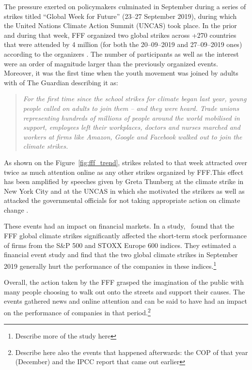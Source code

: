 \documentclass[12pt]{article}
\begin{document}
The pressure exerted on policymakers culminated in September during a series of strikes titled ``Global Week for Future'' (23--27 September 2019), during which the United Nations Climate Action Summit (UNCAS) took place. In the prior and during that week, FFF organized two global strikes across +270 countries that were attended by 4 million (for both the 20--09--2019 and 27--09--2019 ones) according to the organizers \parencite{fffStrikeStats}. The number of participants as well as the interest were an order of magnitude larger than the previously organized events. Moreover, it was the first time when the youth movement was joined by adults with \citeauthor{watts2019climate} of The Guardian describing it as:

\begin{quote}
    \small
    \textit{For the first time since the school strikes for climate began last year, young people called on adults to join them – and they were heard. Trade unions representing hundreds of millions of people around the world mobilised in support, employees left their workplaces, doctors and nurses marched and workers at firms like Amazon, Google and Facebook walked out to join the climate strikes.} \parencite{watts2019climate}
\end{quote}

As shown on the Figure~\ref{fig:fff_trend}, strikes related to that week attracted over twice as much attention online as any other strikes organized by FFF.\@ This effect has been amplified by speeches given by Greta Thunberg at the climate strike in New York City and at the UNCAS in which she motivated the strikers as well as attacked the governmental officials for not taking appropriate action on climate change \parencite{2019thunberg}.

These events had an impact on financial markets. In a \citeyear{schusterStockPriceReactions2023} study,~\citeauthor{schusterStockPriceReactions2023} found that the FFF global climate strikes significantly affected the short-term stock performance of firms from the S\&P 500 and STOXX Europe 600 indices. They estimated a financial event study and find that the two global climate strikes in September 2019 generally hurt the performance of the companies in these indices.\footnote{Describe more of the study here}

Overall, the action taken by the FFF grasped the imagination of the public with many people choosing to walk out onto the streets and support their causes. The events gathered news and online attention and can be said to have had an impact on the performance of companies in that period.\footnote{Describe here also the events that happened afterwards: the COP of that year (December) and the IPCC report that came out earlier}
\end{document}
